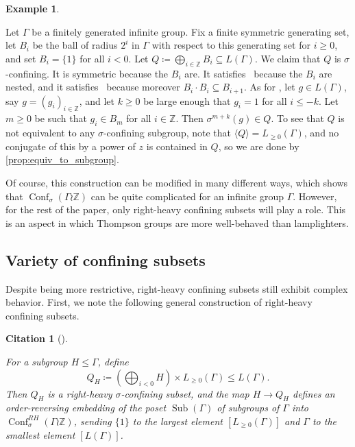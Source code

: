 \documentclass[reqno,12pt]{amsart}\setcounter{tocdepth}{1}
\newtheorem{cit}[theorem]{Citation}
\theoremstyle{definition}
\newtheorem{example}[theorem]{Example}
\newcommand{\Z}{\mathbb{Z}}
\DeclareMathOperator{\Sub}{Sub}
\DeclareMathOperator{\Conf}{Conf}
\numberwithin{equation}{section}
\begin{document}
\begin{example}
\label{ex:balls}

Let $\Gamma$ be a finitely generated infinite group. Fix a finite symmetric generating set, let $B_i$ be the ball of radius $2^i$ in $\Gamma$ with respect to this generating set for $i \geq 0$, and set $B_i = \{ 1 \}$ for all $i < 0$.
Let $Q \coloneqq \bigoplus_{i \in \Z} B_i \subseteq L(\Gamma)$. We claim that $Q$ is $\sigma$-confining. It is symmetric because the $B_i$ are. It satisfies \StayInConf\ because the $B_i$ are nested, and it satisfies \ProdConf\ because moreover $B_i \cdot B_i \subseteq B_{i+1}$. As for \GetInConf, let $g \in L(\Gamma)$, say $g = (g_i)_{i \in \Z}$, and let $k \geq 0$ be large enough that $g_i = 1$ for all $i \leq -k$. Let $m \geq 0$ be such that $g_i \in B_m$ for all $i \in \Z$. Then $\sigma^{m+k}(g) \in Q$. To see that $Q$ is not equivalent to any $\sigma$-confining subgroup, note that $\langle Q \rangle = L_{\geq 0}(\Gamma)$, and no conjugate of this by a power of $z$ is contained in $Q$, so we are done by \cref{prop:equiv_to_subgroup}.
\end{example}

Of course, this construction can be modified in many different ways, which shows that $\Conf_\sigma(\Gamma \wr \Z)$ can be quite complicated for an infinite group $\Gamma$. However, for the rest of the paper, only right-heavy confining subsets will play a role. This is an aspect in which Thompson groups are more well-behaved than lamplighters.


\subsection{Variety of confining subsets}

Despite being more restrictive, right-heavy confining subsets still exhibit complex behavior. First, we note the following general construction of right-heavy confining subsets.

\begin{cit}[{\cite[Theorem 1.4]{sahana:wreath}}]
\label{cit:subgroups}

For a subgroup $H \leq \Gamma$, define
\[
Q_H \coloneqq \left(\bigoplus_{i < 0} H\right) \times L_{\geq 0}(\Gamma) \leq L(\Gamma).
\]
Then $Q_H$ is a right-heavy $\sigma$-confining subset, and the map $H \to Q_H$ defines an order-reversing embedding of the poset $\Sub(\Gamma)$ of subgroups of $\Gamma$ into $\Conf_\sigma^{RH}(\Gamma \wr \Z)$, sending $\{ 1 \}$ to the largest element $[L_{\geq 0}(\Gamma)]$ and $\Gamma$ to the smallest element $[L(\Gamma)]$. 
\end{cit}
\end{document}
